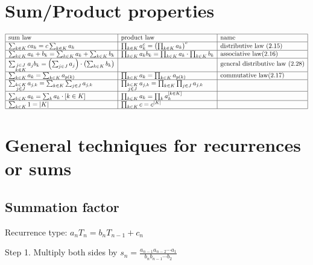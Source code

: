 \documentclass[10pt]{article}
\begin{document}
\begin{multicols}{3}
\section{Sum/Product properties}
{
\everymath{\displaystyle}
\bgroup
\renewcommand{\arraystretch}{2}
$
\begin{array}{|l|l|l|}
\hline
\text{sum law} & \text{product law} & \text{name}\\
\hline
\sum_{k\in K} c a_k = c\sum_{k\in K} a_k & \prod_{k\in K} a_k^c = \left(\prod_{k\in K} a_k \right)^c & \text{distributive law (2.15)}\\
\hline
\sum_{k\in K} a_k + b_k = \sum_{k\in K} a_k + \sum_{k\in K} b_k & \prod_{k\in K} a_k b_k = \prod_{k\in K} a_k \cdot \prod_{k\in K} b_k & \text{associative law(2.16)} \\
\hline
\sum_{\substack{j\in J\\k\in K}} a_j b_k = \left(\sum_{j\in J} a_j\right) \cdot \left(\sum_{k\in K} b_k \right) & & \text{general distributive law (2.28)}\\
\hline
\sum_{k\in K} a_k = \sum_{k\in K} a_{p(k)} & \prod_{k\in K} a_k = \prod_{k\in K} a_{p(k)} & \text{commutative law(2.17)} \\
\hline
\sum_{\substack{k\in K\\j\in J}} a_{j,k} = \sum_{k\in K}\sum_{j\in J} a_{j,k} & \prod_{\substack{k\in K\\j\in J}} a_{j,k} = \prod_{k\in K}\prod_{j\in J} a_{j,k} & \\ 
\hline
\sum_{k\in K} a_k = \sum_{k} a_k \cdot [k\in K] & \prod_{k\in K} a_k = \prod_{k} a_k^{[k\in K]} & \\
\hline
\sum_{k\in K} 1 = |K| & \prod_{k\in K} c = c^{|K|} & \\
\hline
\end{array}
$
\egroup
}

\vfill\null
\columnbreak

\section{General techniques for recurrences or sums}
\subsection{Summation factor}
{\everymath{\displaystyle}
Recurrence type: $a_n T_n = b_n T_{n-1} + c_n$

Step 1. Multiply both sides by $s_n=\frac{a_{n-1}a_{n-2}\cdots a_1}{b_n b_{n-1}\cdots b_2}$

}
\end{multicols}
\end{document}

